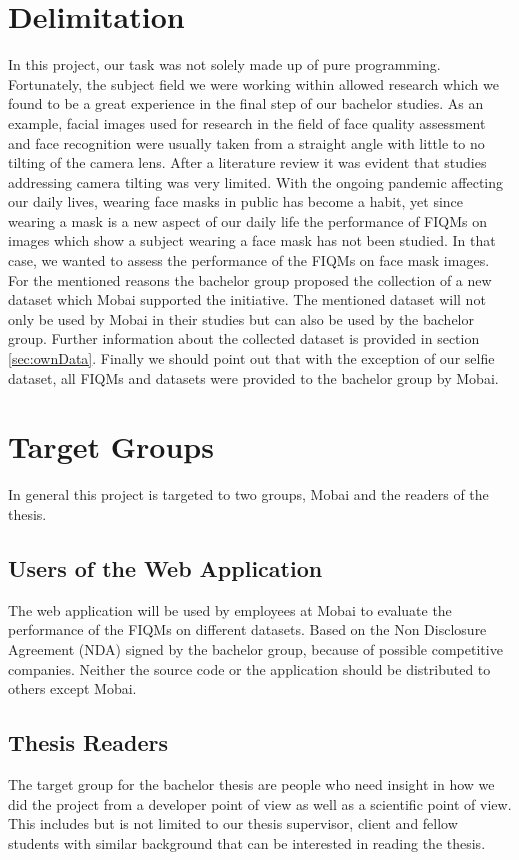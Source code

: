 \section{Delimitation}
\label{sec:delimit}
In this project, our task was not solely made up of pure programming. Fortunately, the subject field we were working within allowed research which we found to be a great experience in the final step of our bachelor studies. As an example, facial images used for research in the field of face quality assessment and face recognition were usually taken from a straight angle with little to no tilting of the camera lens. After a literature review it was evident that studies addressing camera tilting was very limited. With the ongoing pandemic affecting our daily lives, wearing face masks in public has become a habit, yet since wearing a mask is a new aspect of our daily life the performance of FIQMs on images which show a subject wearing a face mask has not been studied. In that case, we wanted to assess the performance of the FIQMs on face mask images. For the mentioned reasons the bachelor group proposed the collection of a new dataset which Mobai supported the initiative. The mentioned dataset will not only be used by Mobai in their studies but can also be used by the bachelor group. Further information about the collected dataset is provided in section \ref{sec:ownData}. Finally we should point out that with the exception of our selfie dataset, all FIQMs and datasets were provided to the bachelor group by Mobai. 

\section{Target Groups}
\label{sec:TargetGroups}
In general this project is targeted to two groups, Mobai and the readers of the thesis. 

\subsection{Users of the Web Application}
The web application will be used by employees at Mobai to evaluate the performance of the FIQMs on different datasets. Based on the Non Disclosure Agreement (NDA) signed by the bachelor group, because of possible competitive companies. Neither the source code or the application should be distributed to others except Mobai.

\subsection{Thesis Readers}
The target group for the bachelor thesis are people who need insight in how we did the project from a developer point of view as well as a scientific point of view. This includes but is not limited to our thesis supervisor,  client and fellow students with similar background that can be interested in reading the thesis.


